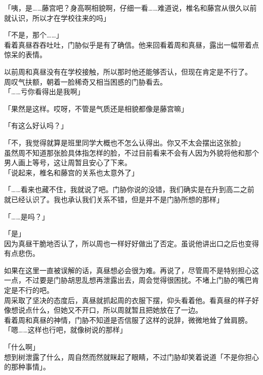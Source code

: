 「咦，是……藤宫吧？身高啊相貌啊，仔细一看……难道说，椎名和藤宫从很久以前就认识，所以才在学校往来的吗」

「不是，那个……」\\

看着真昼吞吞吐吐，门胁似乎是有了确信。他来回看着周和真昼，露出一幅带着点惊呆的表情。

以前周和真昼没有在学校接触，所以那时他还能够否认，但现在肯定是不行了。\\

周叹气扶额，朝着一脸稀奇又相当困惑的门胁看去。\\

「……亏你看得出是我啊」

「果然是这样。哎呀，不管是气质还是相貌都像是藤宫嘛」

「有这么好认吗？」

「不，我觉得就算是班里同学大概也不怎么认得出。你又不太会摆出这张脸」\\

虽然周不知道那张脸具体指怎样的脸，不过目前看来不会有人因为外貌将他和那个男人画上等号，这让周暂且安心了下来。\\

「说起来，椎名和藤宫的关系也太意外了」

「……看来也藏不住，我就说了吧。门胁你说的没错，我们确实是在升到高二之前就已经认识了。我也承认我们关系不错，但是并不是门胁所想的那样」

「……是吗？」

「是」\\

因为真昼干脆地否认了，所以周也一样好好做出了否定。虽说他讲出口之后也变得有点悲伤。

如果在这里一直被误解的话，真昼想必会很为难。再说了，尽管周不是特别担心这一点，不过要是门胁胡思乱想再泄露出去，周会觉得很困扰。不堵上门胁的嘴巴肯定是不行的吧。\\

周采取了坚决的态度后，真昼就抓起周的衣服下摆，仰头看着他。看真昼的样子好像想说点什么，但她又不开口，所以周就暂且把她放在了一边。\\

看着周和真昼的神情，门胁不知道是否信服了这样的说辞，微微地耸了耸肩膀。\\

「嗯……这样也行吧，就像树说的那样」

「什么啊」\\

想到树泄露了什么，周自然而然就眯起了眼睛，不过门胁却笑着说道「不是你担心的那种事情」。\\

